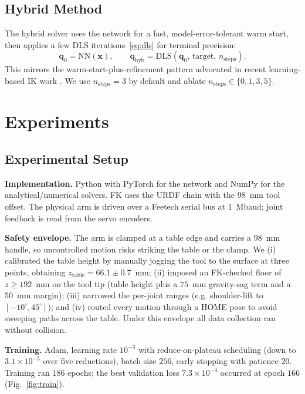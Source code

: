 \documentclass[conference]{IEEEtran}
\begin{document}
\subsection{Hybrid Method}

The hybrid solver uses the network for a fast, model-error-tolerant warm start, then applies a few DLS iterations~\eqref{eq:dls} for terminal precision:
\begin{equation}
\mathbf{q}_0 = \mathrm{NN}(\mathbf{x}), \qquad
\mathbf{q}_{\mathrm{hyb}} = \mathrm{DLS}(\mathbf{q}_0,\, \text{target},\, n_{\mathrm{steps}}).
\end{equation}
This mirrors the warm-start-plus-refinement pattern advocated in recent learning-based IK work \cite{limXGNN2025}. We use $n_{\mathrm{steps}}{=}3$ by default and ablate $n_{\mathrm{steps}}\in\{0,1,3,5\}$.

\section{Experiments}

\subsection{Experimental Setup}
\label{sec:setup}

\textbf{Implementation.} Python with PyTorch for the network and NumPy for the analytical/numerical solvers. FK uses the URDF chain with the $98$~mm tool offset. The physical arm is driven over a Feetech serial bus at $1$~Mbaud; joint feedback is read from the servo encoders.

\textbf{Safety envelope.} The arm is clamped at a table edge and carries a $98$~mm handle, so uncontrolled motion risks striking the table or the clamp. We (i) calibrated the table height by manually jogging the tool to the surface at three points, obtaining $z_{\mathrm{table}}=66.1\pm0.7$~mm; (ii) imposed an FK-checked floor of $z\ge192$~mm on the tool tip (table height plus a $75$~mm gravity-sag term and a $50$~mm margin); (iii) narrowed the per-joint ranges (e.g. shoulder-lift to $[-10^{\circ},45^{\circ}]$); and (iv) routed every motion through a HOME pose to avoid sweeping paths across the table. Under this envelope all data collection ran without collision.

\textbf{Training.} Adam, learning rate $10^{-3}$ with reduce-on-plateau scheduling (down to $3.1\times10^{-5}$ over five reductions), batch size $256$, early stopping with patience $20$. Training ran $186$ epochs; the best validation loss $7.3\times10^{-4}$ occurred at epoch $166$ (Fig.~\ref{fig:train}).
\end{document}
